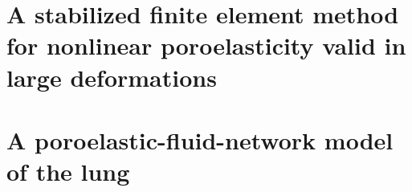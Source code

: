 \documentclass[letterpaper,12pt]{report}
\newenvironment{abstractchap}{\rightskip1in\itshape}{}
\begin{document}
\chapter{A stabilized finite element method for nonlinear poroelasticity valid in large deformations}
\label{chap:large_fem}



% 

%
%

%
%
%


%
%
%
%
%
%
%


\chapter{A poroelastic-fluid-network model of the lung}
\label{chap:lung}


%

% 

%
%
%
\end{document}
